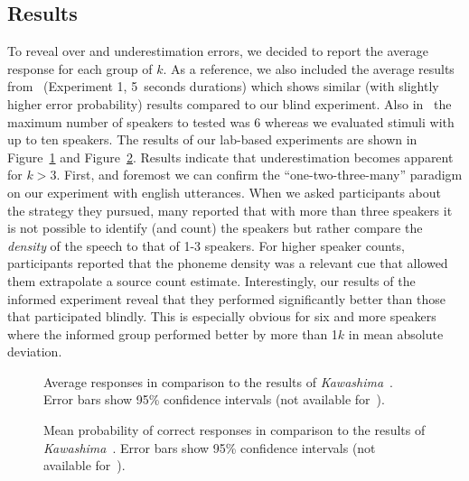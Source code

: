 \subsection{Results}
To reveal over and underestimation errors, we decided to report the average response for each group of \(k\).
As a reference, we also included the average results from~\cite{kawashima15} (Experiment 1, 5~seconds durations) which shows similar (with slightly higher error probability) results compared to our blind experiment.
Also in~\cite{kawashima15} the maximum number of speakers to tested was 6 whereas we evaluated stimuli with up to ten speakers.
The results of our lab-based experiments are shown in Figure~\ref{fig:experimentA} and Figure~\ref{fig:experimentB}.
Results indicate that underestimation becomes apparent for \(k > 3\).
First, and foremost we can confirm the ``one-two-three-many'' paradigm on our experiment with english utterances.
When we asked participants about the strategy they pursued, many reported that with more than three speakers it is not possible to identify (and count) the speakers but rather compare the \emph{density} of the speech to that of 1-3 speakers.
For higher speaker counts, participants reported that the phoneme density was a relevant cue that allowed them extrapolate a source count estimate.
Interestingly, our results of the informed experiment reveal that they performed significantly better than those that participated blindly.
This is especially obvious for six and more speakers where the informed group performed better by more than 1\(k\) in mean absolute deviation.

\begin{figure}[t!]
    \centering
    \begin{adjustbox}{width=0.7\columnwidth}
      
    \end{adjustbox}
    \caption{Average responses in comparison to the results of \emph{Kawashima}~\cite{kawashima15}. Error bars show 95\% confidence intervals (not available for~\cite{kawashima15}).}%
    \label{fig:experimentA}
 \end{figure}

\begin{figure}[t!]
   \centering
   \begin{adjustbox}{width=0.7\columnwidth}
     
   \end{adjustbox}
   \caption{Mean probability of correct responses in comparison to the results of \emph{Kawashima}~\cite{kawashima15}. Error bars show 95\% confidence intervals (not available for~\cite{kawashima15}).}%
   \label{fig:experimentB}
\end{figure}


